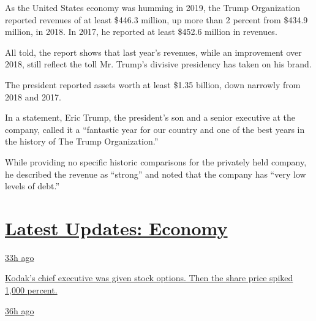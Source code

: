As the United States economy was humming in 2019, the Trump Organization
reported revenues of at least \$446.3 million, up more than 2 percent
from \$434.9 million, in 2018. In 2017, he reported at least \$452.6
million in revenues.

All told, the report shows that last year's revenues, while an
improvement over 2018, still reflect the toll Mr. Trump's divisive
presidency has taken on his brand.

The president reported assets worth at least \$1.35 billion, down
narrowly from 2018 and 2017.

In a statement, Eric Trump, the president's son and a senior executive
at the company, called it a ``fantastic year for our country and one of
the best years in the history of The Trump Organization.''

While providing no specific historic comparisons for the privately held
company, he described the revenue as ``strong'' and noted that the
company has ``very low levels of debt.''

\hypertarget{latest-updates-economy}{%
\section{\texorpdfstring{\href{https://www.nytimes.com/live/2020/07/31/business/stock-market-today-coronavirus?action=click\&pgtype=Article\&state=default\&region=MAIN_CONTENT_1\&context=storylines_live_updates}{Latest
Updates:
Economy}}{Latest Updates: Economy}}\label{latest-updates-economy}}

\href{https://www.nytimes.com/live/2020/07/31/business/stock-market-today-coronavirus?action=click\&pgtype=Article\&state=default\&region=MAIN_CONTENT_1\&context=storylines_live_updates\#kodaks-chief-executive-was-given-stock-options-then-the-share-price-spiked-1000-percent}{33h
ago}

\href{https://www.nytimes.com/live/2020/07/31/business/stock-market-today-coronavirus?action=click\&pgtype=Article\&state=default\&region=MAIN_CONTENT_1\&context=storylines_live_updates\#kodaks-chief-executive-was-given-stock-options-then-the-share-price-spiked-1000-percent}{Kodak's
chief executive was given stock options. Then the share price spiked
1,000 percent.}

\href{https://www.nytimes.com/live/2020/07/31/business/stock-market-today-coronavirus?action=click\&pgtype=Article\&state=default\&region=MAIN_CONTENT_1\&context=storylines_live_updates\#fitch-ratings-downgrades-its-outlook-on-us-debt}{36h
ago}

